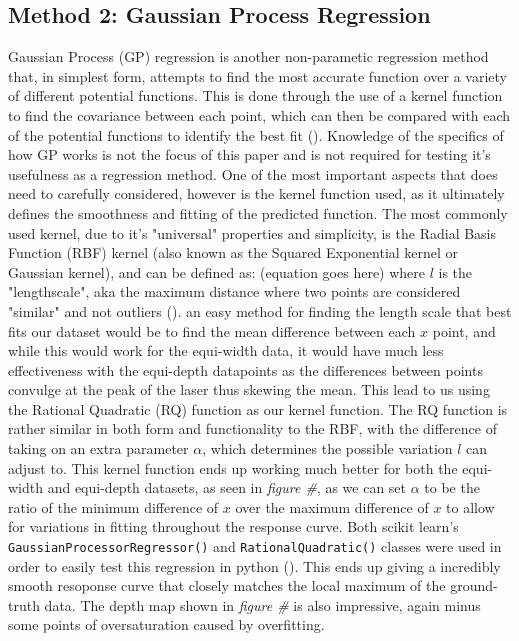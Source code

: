\documentclass[letterpaper,12pt]{article}
\begin{document}
\subsection{Method 2: Gaussian Process Regression}
Gaussian Process (GP) regression is another non-parametic regression method that, in simplest
form, attempts to find the most accurate function over a variety of different potential functions.
This is done through the use of a kernel function to find the covariance between each point, which
can then be compared with each of the potential functions to identify the best fit 
(\cite{wang2020intuitive}). Knowledge of the specifics of how GP works is not the focus of
this paper and is not required for testing it's usefulness as a regression method. One of
the most important aspects that does need to carefully considered, however is the kernel 
function used, as it ultimately defines the smoothness and fitting of the predicted function.
The most commonly used kernel, due to it's "universal" properties and simplicity, is the
Radial Basis Function (RBF) kernel (also known as the Squared Exponential kernel or Gaussian
kernel), and can be defined as: (equation goes here) where $l$ is the "lengthscale", aka the
maximum distance where two points are considered "similar" and not outliers (\cite{Duvenaud}). 
an easy method for finding the length scale that best fits our dataset would be to find the 
mean difference between each $x$ point, and while this would work for the equi-width data,
it would have much less effectiveness with the equi-depth datapoints as the differences between 
points convulge at the peak of the laser thus skewing the mean. This lead to us using the 
Rational Quadratic (RQ) function as our kernel function. The RQ function is rather similar in 
both form and functionality to the RBF, with the difference of taking on an extra parameter 
$\alpha$, which determines the possible variation $l$ can adjust to. This kernel function ends 
up working much better for both the equi-width and equi-depth datasets, as seen in \emph{figure \#},
as we can set $\alpha$ to be the ratio of the minimum difference of $x$ over the maximum difference 
of $x$ to allow for variations in fitting throughout the response curve. Both scikit learn's 
\verb|GaussianProcessorRegressor()| and \verb|RationalQuadratic()| classes were used in order
to easily test this regression in python (\cite{scikit-learn}). This ends up giving a incredibly 
smooth resoponse curve that closely matches the local maximum of the ground-truth data. The depth
map shown in \emph{figure \#} is also impressive, again minus some points of oversaturation
caused by overfitting.
\end{document}
